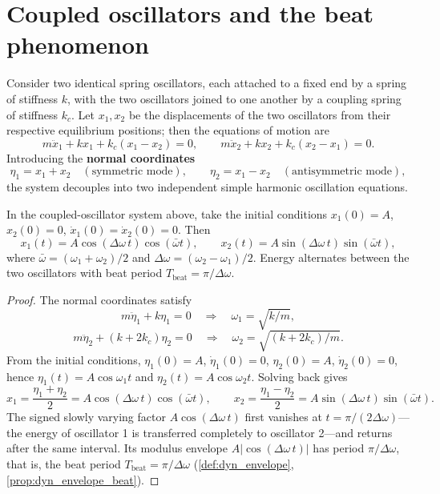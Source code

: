 \section{Coupled oscillators and the beat phenomenon}

\begin{definition}\label{def:coupled_oscillators}
Consider two identical spring oscillators, each attached to a fixed end by a spring of stiffness $k$, with the two oscillators joined to one another by a coupling spring of stiffness $k_c$. Let $x_1, x_2$ be the displacements of the two oscillators from their respective equilibrium positions; then the equations of motion are
\[
m\ddot{x}_1 + kx_1 + k_c(x_1 - x_2) = 0, \qquad m\ddot{x}_2 + kx_2 + k_c(x_2 - x_1) = 0.
\]
Introducing the \textbf{normal coordinates}
\[
\eta_1 = x_1 + x_2 \quad (\text{symmetric mode}), \qquad \eta_2 = x_1 - x_2 \quad (\text{antisymmetric mode}),
\]
the system decouples into two independent simple harmonic oscillation equations.
\end{definition}

\begin{proposition}\label{prop:beat_phenomenon}
In the coupled-oscillator system above, take the initial conditions $x_1(0) = A$, $x_2(0) = 0$, $\dot x_1(0) = \dot x_2(0) = 0$. Then
\[
x_1(t) = A\cos(\Delta\omega \, t)\cos(\bar{\omega} t), \qquad x_2(t) = A\sin(\Delta\omega \, t)\sin(\bar{\omega} t),
\]
where $\bar\omega = (\omega_1 + \omega_2)/2$ and $\Delta\omega = (\omega_2 - \omega_1)/2$. Energy alternates between the two oscillators with beat period $T_{\text{beat}} = \pi/\Delta\omega$.
\end{proposition}

\begin{proof}
The normal coordinates satisfy
\[
m\ddot\eta_1 + k\eta_1 = 0 \quad \Rightarrow \quad \omega_1 = \sqrt{k/m},
\]
\[
m\ddot\eta_2 + (k + 2k_c)\eta_2 = 0 \quad \Rightarrow \quad \omega_2 = \sqrt{(k+2k_c)/m}.
\]
From the initial conditions, $\eta_1(0) = A$, $\dot\eta_1(0) = 0$, $\eta_2(0) = A$, $\dot\eta_2(0) = 0$, hence $\eta_1(t) = A\cos\omega_1 t$ and $\eta_2(t) = A\cos\omega_2 t$. Solving back gives
\[
x_1 = \frac{\eta_1 + \eta_2}{2} = A\cos(\Delta\omega\, t)\cos(\bar\omega t), \qquad
x_2 = \frac{\eta_1 - \eta_2}{2} = A\sin(\Delta\omega\, t)\sin(\bar\omega t).
\]
The signed slowly varying factor $A\cos(\Delta\omega\, t)$ first vanishes at $t = \pi/(2\Delta\omega)$---the energy of oscillator 1 is transferred completely to oscillator 2---and returns after the same interval. Its modulus envelope $A|\cos(\Delta\omega\, t)|$ has period $\pi/\Delta\omega$, that is, the beat period $T_{\text{beat}} = \pi/\Delta\omega$ (\cref{def:dyn_envelope}, \cref{prop:dyn_envelope_beat}).
\end{proof}

